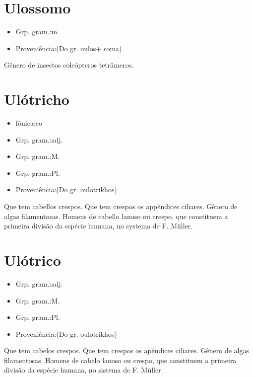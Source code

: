 \documentclass{article}
\begin{document}
\section{Ulossomo}
\begin{itemize}
\item {Grp. gram.:m.}
\end{itemize}
\begin{itemize}
\item {Proveniência:(Do gr. \textunderscore oulos\textunderscore  + \textunderscore soma\textunderscore )}
\end{itemize}
Gênero de insectos coleópteros tetrâmeros.
\section{Ulótricho}
\begin{itemize}
\item {fónica:co}
\end{itemize}
\begin{itemize}
\item {Grp. gram.:adj.}
\end{itemize}
\begin{itemize}
\item {Grp. gram.:M.}
\end{itemize}
\begin{itemize}
\item {Grp. gram.:Pl.}
\end{itemize}
\begin{itemize}
\item {Proveniência:(Do gr. \textunderscore oulotrikhos\textunderscore )}
\end{itemize}
Que tem cabellos crespos.
Que tem crespos os appêndices ciliares.
Gênero de algas filamentosas.
Homens de cabello lanoso ou crespo, que constituem a primeira divisão da espécie humana, no systema de F. Müller.
\section{Ulótrico}
\begin{itemize}
\item {Grp. gram.:adj.}
\end{itemize}
\begin{itemize}
\item {Grp. gram.:M.}
\end{itemize}
\begin{itemize}
\item {Grp. gram.:Pl.}
\end{itemize}
\begin{itemize}
\item {Proveniência:(Do gr. \textunderscore oulotrikhos\textunderscore )}
\end{itemize}
Que tem cabelos crespos.
Que tem crespos os apêndices ciliares.
Gênero de algas filamentosas.
Homens de cabelo lanoso ou crespo, que constituem a primeira divisão da espécie humana, no sistema de F. Müller.
\end{document}
